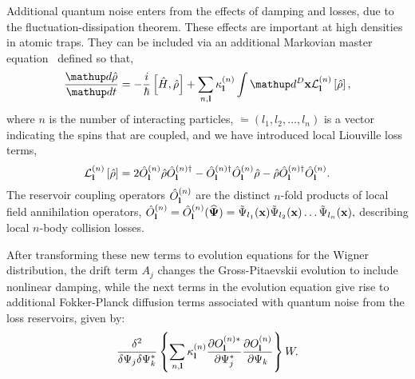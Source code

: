 Additional quantum noise enters from the effects of damping and losses,
due to the fluctuation-dissipation theorem.
These effects are important at high densities in atomic traps.
They can be included via an additional Markovian master equation~\cite{Jack2002}
defined so that,
\begin{equation}
    \frac{\upd\hat{\rho}}{\upd t} =
        - \frac{i}{\hbar} \left[ \hat{H}, \hat{\rho} \right]
        + \sum_{n,\lvec} \kappa_{\lvec}^{(n)} \int \upd^{D}\xvec
            \mathcal{L}_{\lvec}^{(n)} \left[ \hat{\rho} \right],
\end{equation}
where $n$ is the number of interacting particles,
$\lvec = (l_1, l_2, \ldots, l_n)$ is a vector indicating the spins that are coupled,
and we have introduced local Liouville loss terms,
\begin{equation}
    \mathcal{L}_{\mathbf{l}}^{(n)} \left[ \hat{\rho} \right] =
        2\hat{O}_{\mathbf{l}}^{(n)} \hat{\rho} \hat{O}_{\mathbf{l}}^{(n)\dagger}
        - \hat{O}_{\mathbf{l}}^{(n)\dagger} \hat{O}_{\mathbf{l}}^{(n)} \hat{\rho}
        - \hat{\rho} \hat{O}_{\mathbf{l}}^{(n)\dagger} \hat{O}_{\mathbf{l}}^{(n)}.
\end{equation}
The reservoir coupling operators $\hat{O}_{\mathbf{l}}^{(n)}$ are the distinct $n$-fold products of local field annihilation operators,
$\hat{O}_{\mathbf{l}}^{(n)} = \hat{O}_{\mathbf{l}}^{(n)} (\widehat{\mathbf{\Psi}}) =
    \tilde{\Psi}_{l_{1}} (\mathbf{x})
    \tilde{\Psi}_{l_{2}} (\mathbf{x}) \ldots
    \tilde{\Psi}_{l_{n}} (\mathbf{x}),$
describing local $n$-body collision losses.

After transforming these new terms to evolution equations for the Wigner distribution, the drift term $A_j$
changes the Gross-Pitaevskii evolution to include nonlinear damping, while
the next terms in the evolution equation give rise to additional Fokker-Planck
diffusion terms associated with quantum noise from the loss reservoirs,
given by:
\begin{equation}
    \frac{\delta^{2}}{\delta\Psi_j\delta\Psi_k^{*}} \left\{
        \sum_{n,\mathbf{l}} \kappa_{\mathbf{l}}^{(n)}
            \frac{\partial O_{\mathbf{l}}^{(n)*}}{\partial\Psi_j^{*}}
            \frac{\partial O_{\mathbf{l}}^{(n)}}{\partial\Psi_k}
        \right\} W.
\end{equation}

